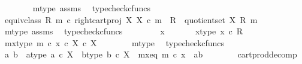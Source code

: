 \begin{isabellebody}
\ \ \ \ \ \ \isamarkupfalse%
\ m{\isacharunderscore}{\kern0pt}type\ assms\ \isamarkupfalse%
\ typecheck{\isacharunderscore}{\kern0pt}cfuncs\isanewline
\ \ \ \ \isamarkupfalse%
\ {\isachardoublequoteopen}equiv{\isacharunderscore}{\kern0pt}class\ {\isacharparenleft}{\kern0pt}R{\isacharcomma}{\kern0pt}\ m{\isacharparenright}{\kern0pt}\ {\isasymcirc}\isactrlsub c\ right{\isacharunderscore}{\kern0pt}cart{\isacharunderscore}{\kern0pt}proj\ X\ X\ {\isasymcirc}\isactrlsub c\ m\ {\isacharcolon}{\kern0pt}\ R\ {\isasymrightarrow}\ quotient{\isacharunderscore}{\kern0pt}set\ X\ {\isacharparenleft}{\kern0pt}R{\isacharcomma}{\kern0pt}\ m{\isacharparenright}{\kern0pt}{\isachardoublequoteclose}\isanewline
\ \ \ \ \ \ \isamarkupfalse%
\ m{\isacharunderscore}{\kern0pt}type\ assms\ \isamarkupfalse%
\ typecheck{\isacharunderscore}{\kern0pt}cfuncs\isanewline
\ \ \isamarkupfalse%
\isanewline
\ \ \ \ \isamarkupfalse%
\ x\ \isanewline
\ \ \ \ \isamarkupfalse%
\ x{\isacharunderscore}{\kern0pt}type{\isacharcolon}{\kern0pt}\ {\isachardoublequoteopen}x\ {\isasymin}\isactrlsub c\ R{\isachardoublequoteclose}\isanewline
\ \ \ \ \isamarkupfalse%
\ \isamarkupfalse%
\ m{\isacharunderscore}{\kern0pt}x{\isacharunderscore}{\kern0pt}type{\isacharcolon}{\kern0pt}\ {\isachardoublequoteopen}m\ {\isasymcirc}\isactrlsub c\ x\ {\isasymin}\isactrlsub c\ X\ {\isasymtimes}\isactrlsub c\ X{\isachardoublequoteclose}\isanewline
\ \ \ \ \ \ \isamarkupfalse%
\ m{\isacharunderscore}{\kern0pt}type\ \isamarkupfalse%
\ typecheck{\isacharunderscore}{\kern0pt}cfuncs\isanewline
\ \ \ \ \isamarkupfalse%
\ \isamarkupfalse%
\ a\ b\ \ a{\isacharunderscore}{\kern0pt}type{\isacharcolon}{\kern0pt}\ {\isachardoublequoteopen}a\ {\isasymin}\isactrlsub c\ X{\isachardoublequoteclose}\ \ b{\isacharunderscore}{\kern0pt}type{\isacharcolon}{\kern0pt}\ {\isachardoublequoteopen}b\ {\isasymin}\isactrlsub c\ X{\isachardoublequoteclose}\ \ m{\isacharunderscore}{\kern0pt}x{\isacharunderscore}{\kern0pt}eq{\isacharcolon}{\kern0pt}\ {\isachardoublequoteopen}m\ {\isasymcirc}\isactrlsub c\ x\ {\isacharequal}{\kern0pt}\ {\isasymlangle}a{\isacharcomma}{\kern0pt}b{\isasymrangle}{\isachardoublequoteclose}\isanewline
\ \ \ \ \ \ \isamarkupfalse%
\ cart{\isacharunderscore}{\kern0pt}prod{\isacharunderscore}{\kern0pt}decomp\ \isamarkupfalse%

\end{isabellebody}
